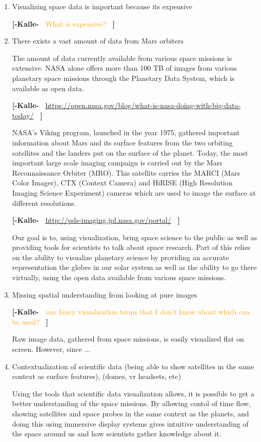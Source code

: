\documentclass[journal]{vgtc}                %
\newcommand{\kallecomment}[1]{\textbf{[-Kalle-~}
    \textcolor{orange}{#1}
    \textbf{~]}}
\begin{document}
\begin{enumerate}
\item Visualizing space data is important because its expensive

\kallecomment{What is expensive?}

\item There exists a vast amount of data from Mars orbiters

The amount of data currently available from various space missions is extensive.
NASA alone offers more than 100 TB of images from various planetary space missions through the Planetary Data System, which is available as open data.

\kallecomment{\url{https://open.nasa.gov/blog/what-is-nasa-doing-with-big-data-today/}}

NASA's Viking program, launched in the year 1975, gathered important information about Mars and its surface features from the two orbiting satellites and the landers put on the surface of the planet.
Today, the most important large scale imaging campaign is carried out by the Mars Reconnaissance Orbiter (MRO).
This satellite carries the MARCI (Mars Color Imager), CTX (Context Camera) and HiRISE (High Resolution Imaging Science Experiment) cameras which are used to image the surface at different resolutions.

\kallecomment{\url{http://pds-imaging.jpl.nasa.gov/portal/}}

Our goal is to, using visualization, bring space science to the public as well as providing tools for scientists to talk about space research.
Part of this relies on the ability to visualize planetary science by providing an accurate representation the globes in our solar system as well as the ability to go there virtually, using the open data available from various space missions.

\item Missing spatial understanding from looking at pure images

\kallecomment{any fancy visualization terms that I don't know about which can be used?}

Raw image data, gathered from space missions, is easily visualized flat on screen. However, since ... 

\item Contextualization of scientific data (being able to show satellites in the same context as surface features), (domes, vr headsets, etc)

Using the tools that scientific data visualization allows, it is possible to get a better understanding of the space missions.
By allowing contol of time flow, showing satellites and space probes in the same context as the planets, and doing this using immersive display systems gives intuitive understanding of the space around us and how scientists gather knowledge about it.


\end{enumerate}
\end{document}

